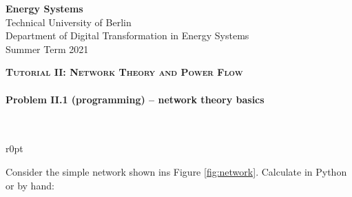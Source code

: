 \documentclass[11pt,a4paper,fleqn]{scrartcl}
\begin{document}
\begin{flushright}
\textbf{Energy Systems}\\
{\small Technical University of Berlin}\\
{\small Department of Digital Transformation in Energy Systems}\\
{\small Summer Term 2021}\\
\end{flushright}

 
 \vspace{-0.5em}
 \hrulefill
 \vspace{0.3em}

\begin{center}
 \textbf{\textsc{\Large Tutorial II: Network Theory and Power Flow}}\\[2.5em]
\end{center}

\vspace{-0.5em}
\hrulefill
\vspace{0.8em}

\paragraph{Problem II.1 (programming) -- network theory basics \faGroup}~\\

\begin{wrapfigure}[10]{r}{0pt}
 \centering
 \caption{Simple Network}
 \label{fig:network}
\end{wrapfigure}


Consider the simple network shown ins Figure \ref{fig:network}. Calculate in Python or by hand:
\end{document}
